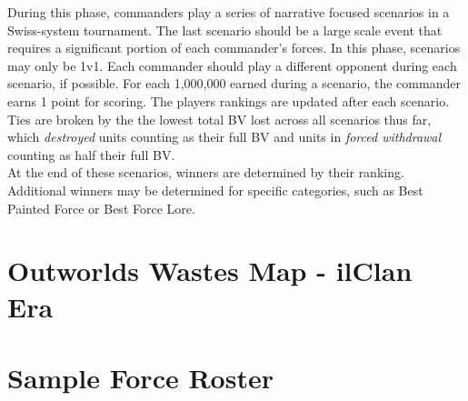 \documentclass{article}
\begin{document}
During this phase, commanders play a series of narrative focused scenarios in a Swiss-system tournament.
The last scenario should be a large scale event that requires a significant portion of each commander's forces.
In this phase, scenarios may only be 1v1.
Each commander should play a different opponent during each scenario, if possible.
For each 1,000,000 earned during a scenario, the commander earns 1 point for scoring.
The players rankings are updated after each scenario.
Ties are broken by the the lowest total BV lost across all scenarios thus far, which \emph{destroyed} units counting as their full BV and units in \emph{forced withdrawal} counting as half their full BV.\\

At the end of these scenarios, winners are determined by their ranking.
Additional winners may be determined for specific categories, such as Best Painted Force or Best Force Lore.

\newpage

\section{Outworlds Wastes Map - ilClan Era}

\begin{figure}[h!]
  \centering
\end{figure}

\newpage

\section{Sample Force Roster}
\end{document}
